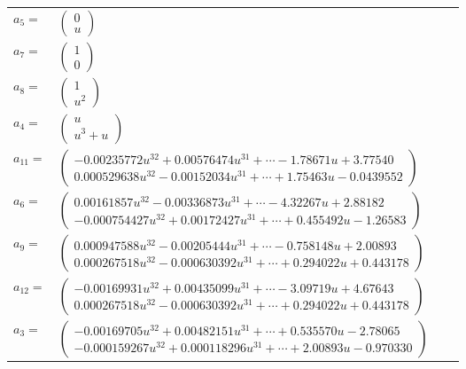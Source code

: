 \documentclass[1p]{elsarticle_modified}
\theoremstyle{definition}
\begin{document}
\begin{tabular}{m{7pt} m{180pt} m{7pt} m{180pt} }
\flushright $a_{5}=$&$\begin{pmatrix}0\\u\end{pmatrix}$ \\
\flushright $a_{7}=$&$\begin{pmatrix}1\\0\end{pmatrix}$ \\
\flushright $a_{8}=$&$\begin{pmatrix}1\\u^2\end{pmatrix}$ \\
\flushright $a_{4}=$&$\begin{pmatrix}u\\u^3+u\end{pmatrix}$ \\
\flushright $a_{11}=$&$\begin{pmatrix}-0.00235772 u^{32}+0.00576474 u^{31}+\cdots-1.78671 u+3.77540\\0.000529638 u^{32}-0.00152034 u^{31}+\cdots+1.75463 u-0.0439552\end{pmatrix}$ \\
\flushright $a_{6}=$&$\begin{pmatrix}0.00161857 u^{32}-0.00336873 u^{31}+\cdots-4.32267 u+2.88182\\-0.000754427 u^{32}+0.00172427 u^{31}+\cdots+0.455492 u-1.26583\end{pmatrix}$ \\
\flushright $a_{9}=$&$\begin{pmatrix}0.000947588 u^{32}-0.00205444 u^{31}+\cdots-0.758148 u+2.00893\\0.000267518 u^{32}-0.000630392 u^{31}+\cdots+0.294022 u+0.443178\end{pmatrix}$ \\
\flushright $a_{12}=$&$\begin{pmatrix}-0.00169931 u^{32}+0.00435099 u^{31}+\cdots-3.09719 u+4.67643\\0.000267518 u^{32}-0.000630392 u^{31}+\cdots+0.294022 u+0.443178\end{pmatrix}$ \\
\flushright $a_{3}=$&$\begin{pmatrix}-0.00169705 u^{32}+0.00482151 u^{31}+\cdots+0.535570 u-2.78065\\-0.000159267 u^{32}+0.000118296 u^{31}+\cdots+2.00893 u-0.970330\end{pmatrix}$ \\

\end{tabular}
\end{document}
